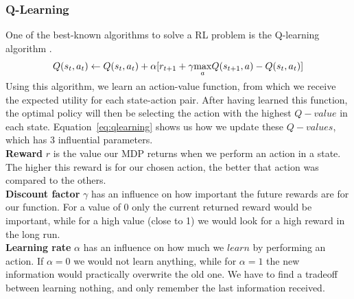 \documentclass[a4paper,12pt]{article}
\begin{document}
\subsubsection{Q-Learning}
One of the best-known algorithms to solve a RL problem is the Q-learning algorithm \cite{sutton1998rl}.
\begin{equation}
Q(s_{t}, a_{t}) \gets Q(s_{t}, a_{t}) + \alpha[r_{t+1} + \gamma\smash{\displaystyle\max_{a}} Q(s_{t+1}, a) - Q(s_{t}, a_{t})]
\label{eq:qlearning}
\end{equation}
Using this algorithm, we learn an action-value function, from which we receive the expected utility for each state-action pair. After having learned this function, the optimal policy will then be selecting the action with the highest $Q-value$ in each state. Equation~\ref{eq:qlearning} shows us how we update these $Q-values$, which has 3 influential parameters.\\
\textbf{Reward} $r$ is the value our MDP returns when we perform an action in a state. The higher this reward is for our chosen action, the better that action was compared to the others.\\
\textbf{Discount factor} $\gamma$ has an influence on how important the future rewards are for our function. For a value of 0 only the current returned reward would be important, while for a high value (close to 1) we would look for a high reward in the long run.\\
\textbf{Learning rate} $\alpha$ has an influence on how much we $learn$ by performing an action. If $\alpha=0$ we would not learn anything, while for $\alpha=1$ the new information would practically overwrite the old one. We have to find a tradeoff between learning nothing, and only remember the last information received.
\end{document}
